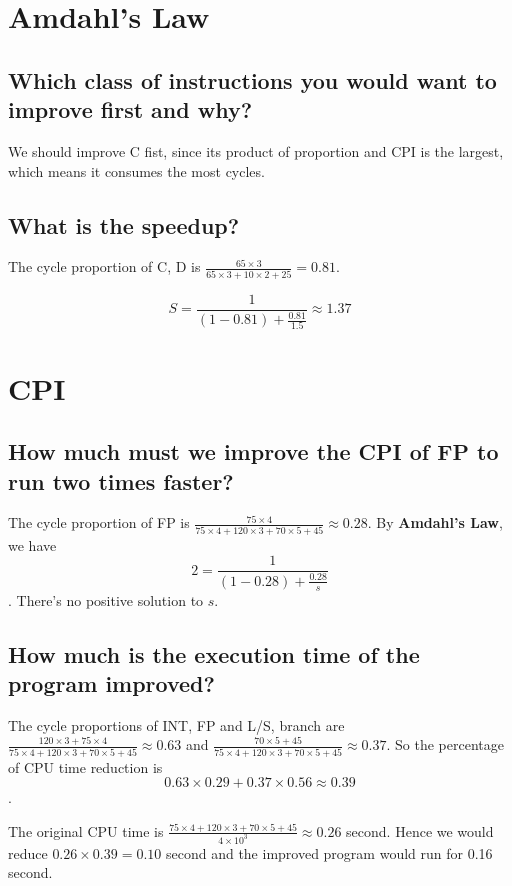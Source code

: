 \documentclass[12pt, a4paper]{article}
\begin{document}
\section{Amdahl’s Law}

\subsection{Which class of instructions you would want to improve first and why?}

We should improve C fist, since its product of proportion and CPI is the largest, which means it consumes the most cycles.

\subsection{What is the speedup?}

The cycle proportion of C, D is $\frac{65\times3}{65\times3+10\times2+25}=0.81$.

$$S=\frac{1}{(1-0.81)+\frac{0.81}{1.5}}\approx1.37$$

\section{CPI}

\subsection{How much must we improve the CPI of FP to run two times faster?}

The cycle proportion of FP is $\frac{75\times4}{75\times4+120\times3+70\times5+45}\approx0.28$. By \textbf{Amdahl’s Law}, we have $$2=\frac{1}{(1-0.28)+\frac{0.28}{s}}$$. There's no positive solution to $s$.

\subsection{How much is the execution time of the program improved?}

The cycle proportions of INT, FP and L/S, branch are $\frac{120\times3+75\times4}{75\times4+120\times3+70\times5+45}\approx0.63$ and $\frac{70\times5+45}{75\times4+120\times3+70\times5+45}\approx0.37$. So the percentage of CPU time reduction is $$0.63\times0.29+0.37\times0.56\approx0.39$$.

The original CPU time is $\frac{75\times4+120\times3+70\times5+45}{4\times10^3}\approx0.26$ second. Hence we would reduce $0.26\times0.39=0.10$ second and the improved program would run for 0.16 second.
\end{document}

